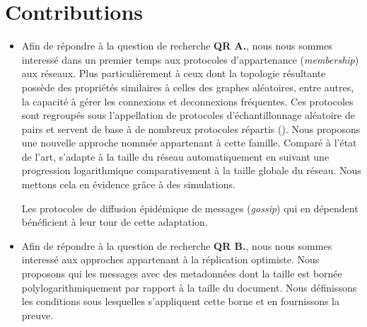 
\section{Contributions}

\begin{itemize}
\item Afin de répondre à la question de recherche \textbf{QR A.}, nous nous
  sommes interessé dans un premier temps aux protocoles d'appartenance
  (\emph{membership}) aux réseaux. Plus particulièrement à ceux dont la
  topologie résultante possède des propriétés similaires à celles des graphes
  aléatoires, entre autres, la capacité à gérer les connexions et deconnexions
  fréquentes. Ces protocoles sont regroupés sous l'appellation de protocoles
  d'échantillonnage aléatoire de pairs et servent de base à de nombreux
  protocoles répartis (\REF). Nous proposons une nouvelle approche nommée \SPRAY
  appartenant à cette famille. Comparé à l'état de l'art, \SPRAY s'adapte à la
  taille du réseau automatiquement en suivant une progression logarithmique
  comparativement à la taille globale du réseau. Nous mettons cela en évidence
  grâce à des simulations.

  Les protocoles de diffusion épidémique de messages (\emph{gossip}) qui en
  dépendent bénéficient à leur tour de cette adaptation. 

\item Afin de répondre à la question de recherche \textbf{QR B.}, nous nous
  sommes interessé aux approches appartenant à la réplication optimiste. Nous
  proposons \LSEQ qui  les messages avec des metadonnées dont la
  taille est bornée polylogarithmiquement par rapport à la taille du
  document.  Nous définissons les conditions sous lesquelles
  s'appliquent cette borne et en fournissons la preuve.
\end{itemize}

